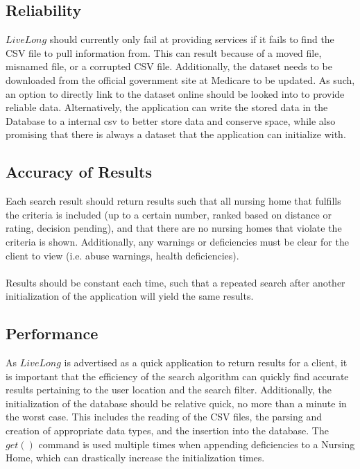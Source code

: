 \documentclass[12pt]{article}
\begin{document}
\subsection{Reliability}
$LiveLong$ should currently only fail at providing services if it fails to find the CSV file to pull information from. This can result because of a moved file, misnamed file, or a corrupted CSV file. Additionally, the dataset needs to be downloaded from the official government site at Medicare to be updated. As such, an option to directly link to the dataset online should be looked into to provide reliable data. Alternatively, the application can write the stored data in the Database to a internal csv to better store data and conserve space, while also promising that there is always a dataset that the application can initialize with.

\subsection{Accuracy of Results}
Each search result should return results such that all nursing home that fulfills the criteria is included (up to a certain number, ranked based on distance or rating, decision pending), and that there are no nursing homes that violate the criteria is shown. Additionally, any warnings or deficiencies must be clear for the client to view (i.e. abuse warnings, health deficiencies). 
\\ \\
Results should be constant each time, such that a repeated search after another initialization of the application will yield the same results.
\subsection{Performance}
As $LiveLong$ is advertised as a quick application to return results for a client, it is important that the efficiency of the search algorithm can quickly find accurate results pertaining to the user location and the search filter. Additionally, the initialization of the database should be relative quick, no more than a minute in the worst case. This includes the reading of the CSV files, the parsing and creation of appropriate data types, and the insertion into the database. The $get()$ command is used multiple times when appending deficiencies to a Nursing Home, which can drastically increase the initialization times. 
\end{document}
